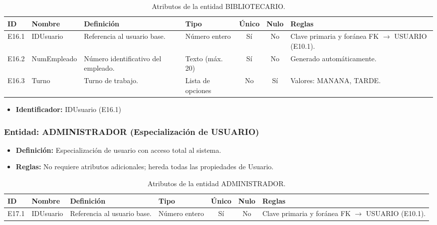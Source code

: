 \begin{table}[H]
	\centering
	\caption{Atributos de la entidad BIBLIOTECARIO.}
	\label{tab:dict_bibliotecario}
	\small
	\begin{tabularx}{\textwidth}{l l X l c c X}
		\toprule
		\textbf{ID} & \textbf{Nombre} & \textbf{Definición} & \textbf{Tipo} & \textbf{Único} & \textbf{Nulo} & \textbf{Reglas} \\
		\midrule
		E16.1 & IDUsuario & Referencia al usuario base. & Número entero & Sí & No & Clave primaria y foránea FK $\rightarrow$ USUARIO (E10.1). \\
		\addlinespace
		E16.2 & NumEmpleado & Número identificativo del empleado. & Texto (máx. 20) & Sí & No & Generado automáticamente. \\
		\addlinespace
		E16.3 & Turno & Turno de trabajo. & Lista de opciones & No & Sí & Valores: MANANA, TARDE. \\
		\bottomrule
	\end{tabularx}
\end{table}

\begin{itemize}
	\item\textbf{Identificador:} IDUsuario (E16.1)
\end{itemize}

\subsubsection{Entidad: ADMINISTRADOR (Especialización de USUARIO)}
\begin{itemize}
	\item\textbf{Definición:} Especialización de usuario con acceso total al sistema.
	\item\textbf{Reglas:} No requiere atributos adicionales; hereda todas las propiedades de Usuario.
\end{itemize}

\begin{table}[H]
	\centering
	\caption{Atributos de la entidad ADMINISTRADOR.}
	\label{tab:dict_administrador}
	\small
	\begin{tabularx}{\textwidth}{l l X l c c X}
		\toprule
		\textbf{ID} & \textbf{Nombre} & \textbf{Definición} & \textbf{Tipo} & \textbf{Único} & \textbf{Nulo} & \textbf{Reglas} \\
		\midrule
		E17.1 & IDUsuario & Referencia al usuario base. & Número entero & Sí & No & Clave primaria y foránea FK $\rightarrow$ USUARIO (E10.1). \\
		\bottomrule
	\end{tabularx}
\end{table}

